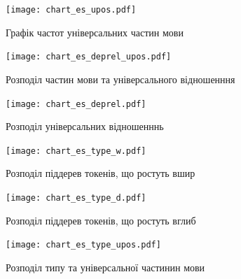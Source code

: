 \begin{multicols}{2}
\begin{figure}[H]
  \begin{center}
    \texttt{[image: chart\_es\_upos.pdf]}
  \end{center}
  \caption{Графік частот універсальних частин мови}
  \label{img:es_upos}
\end{figure}

\begin{figure}[H]
  \begin{center}
    \texttt{[image: chart\_es\_deprel\_upos.pdf]}
  \end{center}
  \caption{Розподіл частин мови та універсального відношенння}
  \label{img:es_deprel_upos}
\end{figure}

\begin{figure}[H]
  \begin{center}
    \texttt{[image: chart\_es\_deprel.pdf]}
  \end{center}
  \caption{Розподіл універсальних відношенннь}
  \label{img:es0}
\end{figure}

\begin{figure}[H]
  \begin{center}
    \texttt{[image: chart\_es\_type\_w.pdf]}
  \end{center}
  \caption{Розподіл піддерев токенів, що ростуть вшир}
  \label{img:es3}
\end{figure}

\begin{figure}[H]
  \begin{center}
    \texttt{[image: chart\_es\_type\_d.pdf]}
  \end{center}
  \caption{Розподіл піддерев токенів, що ростуть вглиб}
  \label{img:es4}
\end{figure}

\begin{figure}[H]
  \begin{center}
    \texttt{[image: chart\_es\_type\_upos.pdf]}
  \end{center}
  \caption{Розподіл типу та універсальної частинин мови}
  \label{img:es5}
\end{figure}


\end{multicols}
